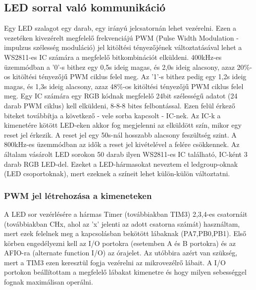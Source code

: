 \documentclass[../main.tex]{subfiles}
\begin{document}
    \subsection{LED sorral való kommunikáció}
        Egy LED szalagot egy darab, egy irányú jelcsatornán lehet vezérelni. Ezen a vezetéken kivezérelt megfelelő frekvenciájú PWM (Pulse Width Modulation - impulzus szélesség moduláció) jel kitöltési tényezőjének változtatásával lehet a WS2811-es IC számára a megfelelő bitkombinációt elküldeni. 400kHz-es üzemmódban a '0'-s bithez egy 0,5\micro s ideig magas, és 2,0\micro s ideig alacsony, azaz 20\%-os kitöltési tényezőjű PWM ciklus felel meg. Az '1'-s bithez pedig egy 1,2\micro s ideig magas, és 1,3\micro s ideig alacsony, azaz 48\%-os kitöltési tényezőjű PWM ciklus felel meg. Egy IC számára egy RGB kódnak megfelelő 24bit szélességű adatot (24 darab PWM ciklus) kell elküldeni, 8-8-8 bites felbontással. Ezen felül érkező biteket továbbítja a következő - vele sorba kapcsolt - IC-nek. Az IC-k a kimenetére kötött LED-eken akkor fog megjelenni az elküldött szín, mikor egy reset jel érkezik. A reset jel egy 50\micro s-nál hosszabb alacsony feszültség szint. A 800kHz-es üzemmódban az idők a reset jel kivételével a felére csökkennek. Az általam vásárolt LED sorokon 50 darab ilyen WS2811-es IC található, IC-ként 3 darab RGB LED-del. Ezeket a LED-hármasokat neveztem el ledgroup-oknak (LED csoportoknak), mert ezeknek a színeit lehet külön-külön változtatni. \cite{ds_ws2811}
        
        \subsubsection{PWM jel létrehozása a kimeneteken}
            A LED sor vezérlésére a hármas Timer (továbbiakban TIM3) 2,3,4-es csatornáit (továbbiakban CHx, ahol az 'x' jelenti az adott csatorna számát) használtam, mert ezek felelnek meg a kapcsolásban bekötött lábaknak (PA7,PB0,PB1). Első körben engedélyezni kell az I/O portokra (esetemben A és B portokra) és az AFIO-ra (alternate function I/O) az órajelet. Az utóbbira azért van szükség, mert a TIM3 ezen keresztül fogja vezérelni az mikrovezélrő lábait. A I/O portokon beállítottam a megfelelő lábakat kimenetre és hogy milyen sebességgel fognak maximálisan operálni.
            
\end{document}
